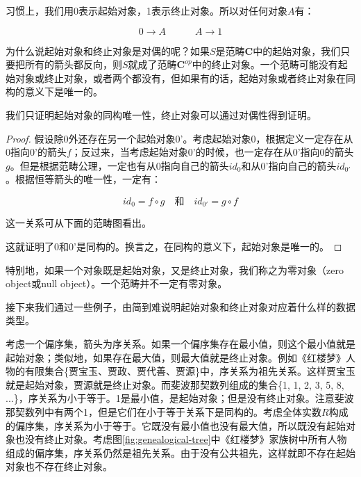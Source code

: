 \documentclass{article}
\begin{document}
习惯上，我们用0表示起始对象，1表示终止对象。所以对任何对象$A$有：

\[
  0 \longrightarrow A \quad \quad \quad A \longrightarrow 1
\]

为什么说起始对象和终止对象是对偶的呢？如果$S$是范畴$\pmb{C}$中的起始对象，我们只要把所有的箭头都反向，则$S$就成了范畴$\pmb{C}^{op}$中的终止对象。一个范畴可能没有起始对象或终止对象，或者两个都没有，但如果有的话，起始对象或者终止对象在同构的意义下是唯一的。

我们只证明起始对象的同构唯一性，终止对象可以通过对偶性得到证明。

\begin{proof}
假设除0外还存在另一个起始对象0'。考虑起始对象0，根据定义一定存在从0指向0'的箭头$f$；反过来，当考虑起始对象0'的时候，也一定存在从0'指向0的箭头$g$。但是根据范畴公理，一定也有从0指向自己的箭头$id_0$和从0'指向自己的箭头$id_{0'}$。根据恒等箭头的唯一性，一定有：

\[
  id_0 = f \circ g \quad \text{和} \quad id_{0'} = g \circ f
\]

这一关系可从下面的范畴图看出。

\begin{center}
\end{center}

这就证明了0和0'是同构的。换言之，在同构的意义下，起始对象是唯一的。
\end{proof}

特别地，如果一个对象既是起始对象，又是终止对象，我们称之为零对象（zero object或null object）。一个范畴并不一定有零对象。

接下来我们通过一些例子，由简到难说明起始对象和终止对象对应着什么样的数据类型。

\begin{example}
考虑一个偏序集，箭头为序关系。如果一个偏序集存在最小值，则这个最小值就是起始对象；类似地，如果存在最大值，则最大值就是终止对象。例如《红楼梦》人物的有限集合\{贾宝玉、贾政、贾代善、贾源\}中，序关系为祖先关系。这样贾宝玉就是起始对象，贾源就是终止对象。而斐波那契数列组成的集合\{1, 1, 2, 3, 5, 8, ...\}，序关系为小于等于。1是最小值，是起始对象；但是没有终止对象。注意斐波那契数列中有两个1，但是它们在小于等于关系下是同构的。考虑全体实数$R$构成的偏序集，序关系为小于等于。它既没有最小值也没有最大值，所以既没有起始对象也没有终止对象。考虑图\ref{fig:genealogical-tree}中《红楼梦》家族树中所有人物组成的偏序集，序关系仍然是祖先关系。由于没有公共祖先，这样就即不存在起始对象也不存在终止对象。
\end{example}
\end{document}
